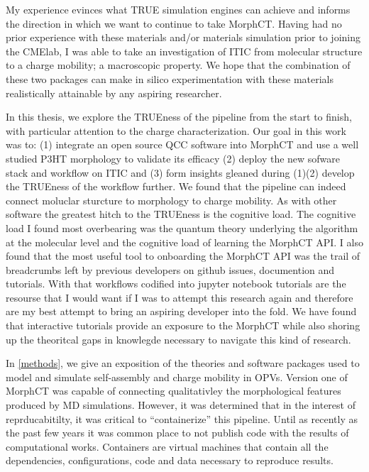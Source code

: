 My experience evinces what TRUE simulation engines can achieve and
informs the direction in which we want to continue to take MorphCT. 
Having had no prior experience with these materials and/or materials simulation prior to joining the CMElab,
I was able to take an investigation of ITIC from molecular
structure to a charge mobility; a macroscopic property. We hope that the combination of these two packages
can make in silico experimentation with these materials realistically attainable by any aspiring researcher.
 
In this thesis, we explore the TRUEness of the pipeline from the start to finish, with particular attention
to the charge characterization.
Our goal in this work was to: (1) integrate an open source QCC software into MorphCT and use a 
well studied P3HT morphology to validate its efficacy (2) deploy the new sofware stack and workflow on ITIC
and (3) form insights gleaned during (1)(2) develop the TRUEness of the workflow further. 
We found that the pipeline can indeed connect moluclar sturcture to morphology to charge
mobility. As with other software the greatest hitch to the TRUEness is the
cognitive load. The cognitive load I found most overbearing was the quantum theory underlying the algorithm 
at the molecular level and the cognitive load of learning the MorphCT API. 
I also found that the most useful tool to onboarding the MorphCT API was the
trail of breadcrumbs left by previous developers on github issues, documention and tutorials. 
With that workflows codified into jupyter notebook tutorials are the resourse that I would want if I was to
attempt this research again and therefore are my best attempt to bring an aspiring developer into the fold.
We have found that interactive tutorials provide an exposure to the MorphCT while also shoring up the
theoritcal gaps in knowlegde necessary to navigate this kind of research. 

In \autoref{methods}, we
give an exposition of the theories and software packages used to model and simulate self-assembly and charge mobility in
OPVs. Version one of MorphCT was capable of
connecting qualitativley the morphological features produced by MD simulations. However, it was determined
that in the interest of reprducabitilty, it was critical to ``containerize'' this pipeline. Until as recently as
the past few years it was common place to not publish code with the results of computational works. Containers
are virtual machines that contain all the dependencies, configurations, code and data necessary to reproduce
results. \cite{Cito2016a}



